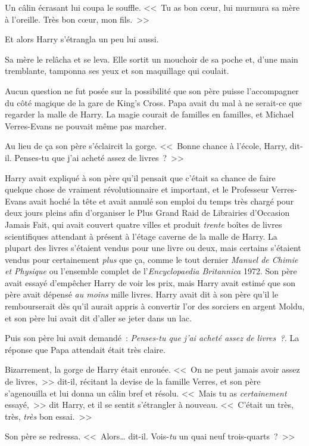Un câlin écrasant lui coupa le souffle. <<~Tu as bon cœur, lui murmura sa mère à l'oreille. Très bon cœur, mon fils.~>>

Et alors Harry s'étrangla un peu lui aussi.

Sa mère le relâcha et se leva. Elle sortit un mouchoir de sa poche et, d'une main tremblante, tamponna ses yeux et son maquillage qui coulait.

Aucun question ne fut posée sur la possibilité que son père puisse l'accompagner du côté magique de la gare de King's Cross. Papa avait du mal à ne serait-ce que regarder la malle de Harry. La magie courait de familles en familles, et Michael Verres-Evans ne pouvait même pas marcher.

Au lieu de ça son père s'éclaircit la gorge. <<~Bonne chance à l'école, Harry, dit-il. Penses-tu que j'ai acheté assez de livres~?~>>

Harry avait expliqué à son père qu'il pensait que c'était sa chance de faire quelque chose de vraiment révolutionnaire et important, et le Professeur Verres-Evans avait hoché la tête et avait annulé son emploi du temps très chargé pour deux jours pleins afin d'organiser le Plus Grand Raid de Librairies d'Occasion Jamais Fait, qui avait couvert quatre villes et produit \emph{trente} boîtes de livres scientifiques attendant à présent à l'étage caverne de la malle de Harry. La plupart des livres s'étaient vendus pour une livre ou deux, mais certains s'étaient vendus pour certainement \emph{plus} que ça, comme le tout dernier \emph{Manuel de Chimie et Physique} ou l'ensemble complet de l'\emph{Encyclopaedia Britannica} 1972. Son père avait essayé d'empêcher Harry de voir les prix, mais Harry avait estimé que son père avait dépensé \emph{au moins} mille livres. Harry avait dit à son père qu'il le rembourserait dès qu'il aurait appris à convertir l'or des sorciers en argent Moldu, et son père lui avait dit d'aller se jeter dans un lac.

Puis son père lui avait demandé~: \emph{Penses-tu que j'ai acheté assez de livres~?.} La réponse que Papa attendait était très claire.

Bizarrement, la gorge de Harry était enrouée. <<~On ne peut jamais avoir assez de livres,~>> dit-il, récitant la devise de la famille Verres, et son père s'agenouilla et lui donna un câlin bref et résolu. <<~Mais tu as \emph{certainement} essayé,~>> dit Harry, et il se sentit s'étrangler à nouveau. <<~C'était un très, très, \emph{très} bon essai.~>>

Son père se redressa. <<~Alors… dit-il. Vois-\emph{tu} un quai neuf trois-quarts~?~>>

